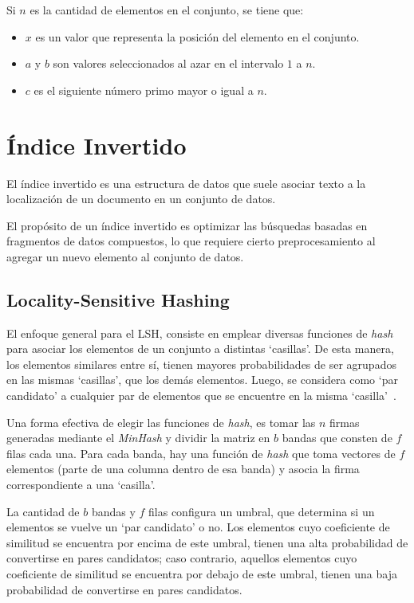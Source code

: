 Si $n$ es la cantidad de elementos en el conjunto, se tiene que:

\begin{itemize}
  \item $x$ es un valor que representa la posición del elemento en el conjunto.
  \item $a$ y $b$ son valores seleccionados al azar en el intervalo $1$ a $n$.
  \item $c$ es el siguiente número primo mayor o igual a $n$.
\end{itemize}

\section{Índice Invertido}
\label{sec:ind}
El índice invertido es una estructura de datos que suele asociar
texto a la localización de un documento en un conjunto de datos.

El propósito de un índice invertido es optimizar las búsquedas basadas en fragmentos de datos compuestos,
lo que requiere cierto preprocesamiento al agregar un nuevo elemento al conjunto de datos.

\newpage
\subsection{Locality-Sensitive Hashing}
El enfoque general para el \ac{LSH},
consiste en emplear diversas funciones de \textit{hash} para asociar
los elementos de un conjunto a distintas ‘casillas’.
De esta manera, los elementos similares entre sí,
tienen mayores probabilidades de ser agrupados en las mismas ‘casillas’,
que los demás elementos.
Luego, se considera como ‘par candidato’
a cualquier par de elementos que se encuentre en la misma ‘casilla’~\cite{Rajaraman:2011:MMD:2124405}.

Una forma efectiva de elegir las funciones de \textit{hash},
es tomar las $n$ firmas generadas mediante el \textit{MinHash}
y dividir la matriz en $b$ bandas que consten de $f$ filas cada una.
Para cada banda, hay una función de \textit{hash} que toma vectores de $f$ elementos
(parte de una columna dentro de esa banda)
y asocia la firma correspondiente a una ‘casilla’.


La cantidad de $b$ bandas y $f$ filas configura un umbral,
que determina si un elementos se vuelve un ‘par candidato’ o no.
Los elementos cuyo coeficiente de similitud se encuentra por encima de este umbral,
tienen una alta probabilidad de convertirse en pares candidatos;
caso contrario, aquellos elementos cuyo coeficiente de similitud se encuentra por debajo de este umbral,
tienen una baja probabilidad de convertirse en pares candidatos.

